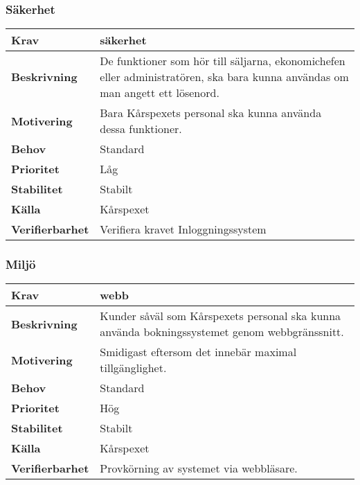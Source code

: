 \documentclass[a4paper, twoside, 11pt, titlepage]{article}
\begin{document}
		\subsubsection{Säkerhet}


		\begin{tabular} { p{2.6cm} p{12.5cm} }
			\hline
			\sffamily\textbf{Krav} & säkerhet  \\
			\hline
			\sffamily\textbf{Beskrivning} & De funktioner som hör till säljarna, ekonomichefen eller administratören, ska bara kunna användas om man angett ett lösenord.  \\
			\hline
			\sffamily\textbf{Motivering} & Bara Kårspexets personal ska kunna använda dessa funktioner.  \\
			\hline
			\sffamily\textbf{Behov} & Standard  \\
			\hline
			\sffamily\textbf{Prioritet} & Låg  \\
			\hline
			\sffamily\textbf{Stabilitet} & Stabilt  \\
			\hline
			\sffamily\textbf{Källa} & Kårspexet  \\
			\hline
			\sffamily\textbf{Verifierbarhet} & Verifiera kravet Inloggningssystem  \\
			\hline
		\end{tabular}


		\subsubsection{Miljö}


		\begin{tabular} { p{2.6cm} p{12.5cm} }
			\hline
			\sffamily\textbf{Krav} & webb  \\
			\hline
			\sffamily\textbf{Beskrivning} & Kunder såväl som Kårspexets personal ska kunna använda bokningssystemet genom webbgränssnitt.  \\
			\hline
			\sffamily\textbf{Motivering} & Smidigast eftersom det innebär maximal tillgänglighet.  \\
			\hline
			\sffamily\textbf{Behov} & Standard  \\
			\hline
			\sffamily\textbf{Prioritet} & Hög  \\
			\hline
			\sffamily\textbf{Stabilitet} & Stabilt  \\
			\hline
			\sffamily\textbf{Källa} & Kårspexet  \\
			\hline
			\sffamily\textbf{Verifierbarhet} & Provkörning av systemet via webbläsare.  \\
			\hline
		\end{tabular}
		\vspace{6mm}
\end{document}
